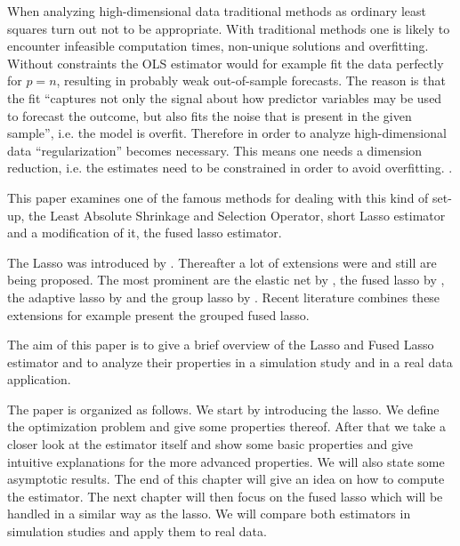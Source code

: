 \documentclass{article}
\theoremstyle{definition}
\begin{document}
When analyzing high-dimensional data traditional methods as ordinary least squares turn out not to be appropriate. With traditional methods one is likely to encounter infeasible computation times, non-unique solutions and overfitting. Without constraints the OLS estimator would for example fit the data perfectly for $p=n$, resulting in probably weak out-of-sample forecasts. The reason is that the fit “captures not only the signal about how predictor variables may be used to forecast the outcome, but also fits the noise that is present in the given sample”, i.e. the model is overfit.
Therefore in order to analyze high-dimensional data “regularization” becomes necessary. This means one needs a dimension reduction, i.e. the estimates need to be constrained in order to avoid overfitting.  \citep{belloni2014}.

This paper examines one of the famous methods for dealing with this kind of set-up, the Least Absolute Shrinkage and Selection Operator, short Lasso estimator and a modification of it, the fused lasso estimator.




The Lasso was introduced by \citet{lasso}. Thereafter a lot of extensions were and still are being proposed. The most prominent are the elastic net by \citet{zou2005regularization}, the fused lasso by \citet{fused}, the adaptive lasso by \citet{zou2006adaptive} and  the group lasso by \citet{meier2008group}. Recent literature combines these extensions for example  \citet{bleakley2011group} present the grouped fused lasso.

The aim of this paper is to give a brief overview of the Lasso and Fused Lasso estimator and to analyze their properties in a simulation study and in a real data application. 

The paper is organized as follows. We start by introducing the lasso. We define the optimization problem and give some properties thereof. After that we take a closer look at the estimator itself and show some basic properties and give intuitive explanations for the more advanced properties. We will also state some asymptotic results. The end of this chapter will give an idea on how to compute the estimator. The next chapter will then focus on the fused lasso which will be handled in a similar way as the lasso. We will compare both estimators in simulation studies and apply them to real data.
\end{document}
